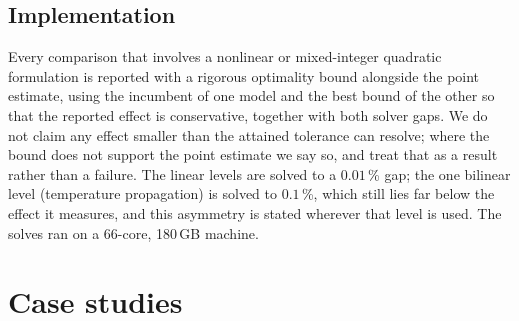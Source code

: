 \documentclass[a4paper,fleqn]{cas-dc}
\begin{document}
\subsection{Implementation}
Every comparison that involves a nonlinear or mixed-integer quadratic formulation is reported
with a rigorous optimality bound alongside the point estimate, using the incumbent of one model
and the best bound of the other so that the reported effect is conservative, together with both
solver gaps. We do not claim any effect smaller than the attained tolerance can resolve; where
the bound does not support the point estimate we say so, and treat that as a result rather than
a failure. The linear levels are solved to a $0.01$\,\% gap; the one bilinear level
(temperature propagation) is solved to $0.1$\,\%, which still lies far below the effect it
measures, and this asymmetry is stated wherever that level is used. The solves ran on a
66-core, 180\,GB machine.

\section{Case studies}
\label{sec:cases}
\end{document}
